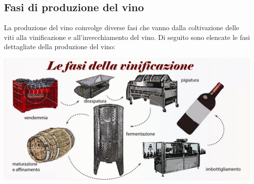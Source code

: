 \documentclass[12pt, a4paper]{article}
\begin{document}
\subsection{Fasi di produzione del vino}
La produzione del vino coinvolge diverse fasi che vanno dalla coltivazione delle viti alla vinificazione e all'invecchiamento del vino. Di seguito sono elencate le fasi dettagliate della produzione del vino:
\begin{center}
    \includegraphics[width=\textwidth]{images/vinificazione-fasi-1.png}
\end{center}
\end{document}

